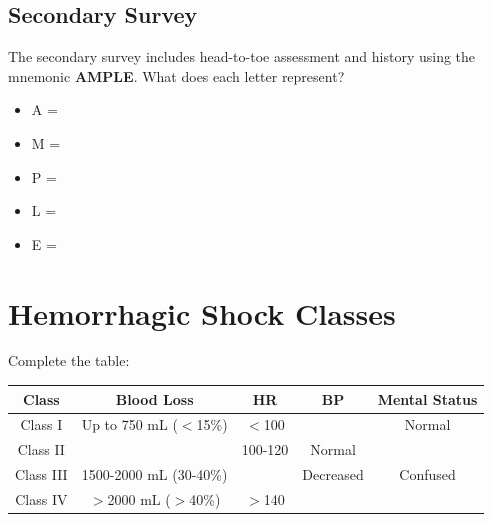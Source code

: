 \documentclass[11pt]{article}
\begin{document}
\subsection{Secondary Survey}
The secondary survey includes head-to-toe assessment and history using the mnemonic \textbf{AMPLE}. What does each letter represent?

\begin{itemize}
    \item A = \underline{\hspace{3cm}}
    \item M = \underline{\hspace{3cm}}
    \item P = \underline{\hspace{3cm}}
    \item L = \underline{\hspace{3cm}}
    \item E = \underline{\hspace{3cm}}
\end{itemize}

\hrulefill

\section{Hemorrhagic Shock Classes}

Complete the table:

\begin{center}
\begin{tabular}{|c|c|c|c|c|}
\hline
\textbf{Class} & \textbf{Blood Loss} & \textbf{HR} & \textbf{BP} & \textbf{Mental Status} \\
\hline
Class I & Up to 750 mL ($<$15\%) & $<$100 & \underline{\hspace{1.5cm}} & Normal \\
\hline
Class II & \underline{\hspace{2.5cm}} & 100-120 & Normal & \underline{\hspace{2cm}} \\
\hline
Class III & 1500-2000 mL (30-40\%) & \underline{\hspace{1.5cm}} & Decreased & Confused \\
\hline
Class IV & $>$2000 mL ($>$40\%) & $>$140 & \underline{\hspace{1.5cm}} & \underline{\hspace{2.5cm}} \\
\hline
\end{tabular}
\end{center}
\end{document}
